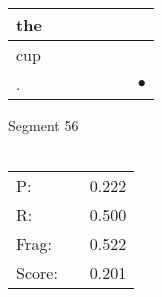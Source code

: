 \documentclass[landscape]{article}
\newcommand{\ssp}{\hspace{2pt}}
\newcommand{\mex}{\cellcolor{g}$\bullet$}
\begin{document}
\begin{tabular}{|l|p{10pt}|p{10pt}|p{10pt}|p{10pt}|p{10pt}|p{10pt}|}
\hline
\ssp the \ssp&\hspace{2pt}&\hspace{2pt}&\hspace{2pt}&\hspace{2pt}&\hspace{2pt}&\hspace{2pt}\\
\hline
\ssp cup \ssp&\hspace{2pt}&\hspace{2pt}&\hspace{2pt}&\hspace{2pt}&\hspace{2pt}&\hspace{2pt}\\
\hline
\ssp \cellcolor{ref5}. \ssp&\hspace{2pt}&\hspace{2pt}&\hspace{2pt}&\hspace{2pt}&\hspace{2pt}&\hspace{2pt}\mex\\
\hline
\end{tabular}

\vspace{6pt}
\noindent Segment 56\\\\
\noindent\begin{tabular}{lm{12pt}r}
\hline
P:&&0.222\\
R:&&0.500\\
Frag:&&0.522\\
Score:&&0.201\\
\end{tabular}

\newpage
\end{document}
